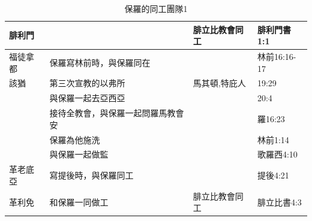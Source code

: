 \begin{table}[htbp]
\begin{tabular}{|l|l|l|l|}
     \midrule
     腓利門&  & 腓立比教會同工&腓利門書1:1\\ \midrule
     福徒拿都&保羅寫林前時，與保羅同在 & &林前16:16-17\\ \midrule 
     該猶   &第三次宣教的以弗所 & 馬其頓,特庇人 &19:29 \\
      &與保羅一起去亞西亞 &   &20:4  \\
      & 接待全教會，與保羅一起問羅馬教會安 &   & 羅16:23 \\
      &  保羅為他施洗  &  & 林前1:14 \\  
        &  與保羅一起做監  &  & 歌羅西4:10 \\  
      \midrule    
 革老底亞&寫提後時，與保羅同工  &  & 提後4:21 \\ \midrule 
 革利免&和保羅一同做工 & 腓立比教會同工&腓立比書4:3\\ 
     \bottomrule
    \end{tabular}%
      \caption{保羅的同工團隊1}
  \label{tab:addlabel}%
\end{table}%
